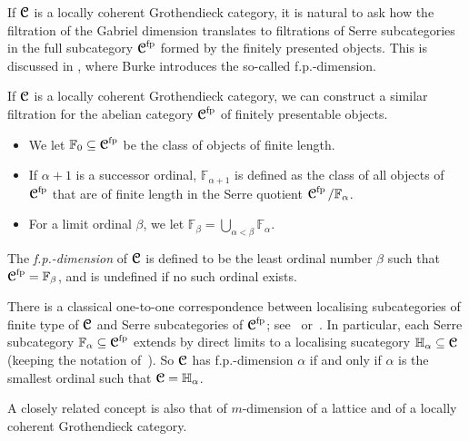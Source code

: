 \documentclass[reqno,a4paper]{amsart}
\begin{document}
If $\operatorname{\boldsymbol{\mathcal{C}}}$ is a locally coherent Grothendieck category, it is natural to ask how the filtration of the Gabriel dimension translates to filtrations of Serre subcategories in the full subcategory $\operatorname{\boldsymbol{\mathcal{C}}}^{\mathrm{fp}}$ formed by the finitely presented objects.
This is discussed in  \cite{bur01}, where Burke introduces the so-called f.p.-dimension.
\begin{definition}\label{def:fp-dim}
If $\operatorname{\boldsymbol{\mathcal{C}}}$ is a locally coherent Grothendieck category, we can construct a similar filtration for the abelian category $\operatorname{\boldsymbol{\mathcal{C}}}^{\mathrm{fp}}$ of finitely presentable objects.
\begin{itemize}
\item We let $\mathbb{F}_0\subseteq\operatorname{\boldsymbol{\mathcal{C}}}^{\mathrm{fp}}$ be the class of objects of finite length.
\item If $\alpha+1$ is a successor ordinal, $\mathbb{F}_{\alpha+1}$ is defined as the class of all objects of $\operatorname{\boldsymbol{\mathcal{C}}}^{\mathrm{fp}}$ that are of finite length in the Serre quotient $\operatorname{\boldsymbol{\mathcal{C}}}^{\mathrm{fp}}/\mathbb{F}_\alpha$.
\item For a limit ordinal $\beta$, we let $\mathbb{F}_\beta=\bigcup_{\alpha<\beta}\mathbb{F}_\alpha$.
\end{itemize}
The \emph{f.p.-dimension} of $\operatorname{\boldsymbol{\mathcal{C}}}$ is defined to be the least ordinal number $\beta$ such that $\operatorname{\boldsymbol{\mathcal{C}}}^{\mathrm{fp}}=\mathbb{F}_\beta$, and is undefined if no such ordinal exists.
\end{definition}

\begin{remark}\label{rem:fp-dim}
There is a classical one-to-one correspondence between localising subcategories of finite type of $\operatorname{\boldsymbol{\mathcal{C}}}$ and Serre subcategories of $\operatorname{\boldsymbol{\mathcal{C}}}^{\mathrm{fp}}$; see~\cite[Theorem~2.8]{Herzog:1997}
or~\cite[Corollary~2.10]{loc_coh_grothendieck_spectrum}.
In particular, each Serre subcategory $\mathbb{F}_\alpha\subseteq\operatorname{\boldsymbol{\mathcal{C}}}^{\mathrm{fp}}$ extends by direct limits to a localising sucategory $\mathbb{H}_\alpha\subseteq\operatorname{\boldsymbol{\mathcal{C}}}$ (keeping the notation of~\cite{bur01}).
So $\operatorname{\boldsymbol{\mathcal{C}}}$ has f.p.-dimension $\alpha$ if and only if $\alpha$ is the smallest ordinal such that $\operatorname{\boldsymbol{\mathcal{C}}}=\mathbb{H}_\alpha$.
\end{remark}

A closely related concept is also that of $m$-dimension of a lattice and of a locally coherent Grothendieck category.
\end{document}
